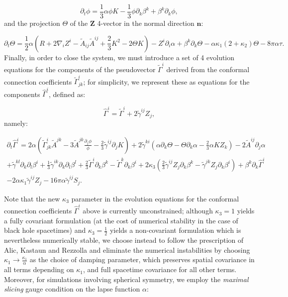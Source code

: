 \documentclass{article}
\begin{document}
\begin{equation}
\partial_t \phi = \frac{1}{3} \alpha \phi K - \frac{1}{3} \phi \partial_k \beta^k + \beta^k \partial_k \phi,
\end{equation}
and the projection ${\Theta}$ of the ${\mathbf{Z}}$ 4-vector in the normal direction ${\mathbf{n}}$:

\begin{equation}
\partial_t \Theta = \frac{1}{2} \alpha \left( R + 2 \nabla_i Z^i - \tilde{A}_{i j} \tilde{A}^{i j} + \frac{2}{3} K^2 - 2 \Theta K \right) - Z^i \partial_i \alpha + \beta^k \partial_k \Theta - \alpha \kappa_1 \left( 2 + \kappa_2 \right) \Theta - 8 \pi \alpha \tau.
\end{equation}
Finally, in order to close the system, we must introduce a set of 4 evolution equations for the components of the pseudovector ${\tilde{\Gamma}^{i}}$ derived from the conformal connection coefficients ${\tilde{\Gamma}_{j k}^{i}}$; for simplicity, we represent these as equations for the components ${\hat{\Gamma}^i}$, defined as:

\begin{equation}
\hat{\Gamma}^i = \tilde{\Gamma}^i + 2 \tilde{\gamma}^{i j} Z_j,
\end{equation}
namely:

\begin{multline}
\partial_t \hat{\Gamma}^i = 2 \alpha \left( \tilde{\Gamma}_{j k}^{i} \tilde{A}^{j k} - 3 \tilde{A}^{j k} \frac{\partial_j \phi}{\phi} - \frac{2}{3} \tilde{\gamma}^{i j} \partial_j K \right) + 2 \tilde{\gamma}^{k i} \left( \alpha \partial_k \Theta - \Theta \partial_k \alpha - \frac{2}{3} \alpha K Z_k \right) - 2 \tilde{A}^{i j} \partial_j \alpha\\
+ \tilde{\gamma}^{k l} \partial_k \partial_l \beta^i + \frac{1}{3} \tilde{\gamma}^{i k} \partial_k \partial_l \beta^l + \frac{2}{3} \tilde{\Gamma}^i \partial_k \beta^k - \tilde{\Gamma}^k \partial_k \beta^i + 2 \kappa_3 \left( \frac{2}{3} \tilde{\gamma}^{i j} Z_j \partial_k \beta^k - \tilde{\gamma}^{j k} Z_j \partial_k \beta^i \right) + \beta^k \partial_k \hat{\Gamma}^i\\
- 2 \alpha \kappa_1 \tilde{\gamma}^{i j} Z_j - 16 \pi \alpha \tilde{\gamma}^{i j} S_j.
\end{multline}

Note that the new ${\kappa_3}$ parameter in the evolution equations for the conformal connection coefficients ${\hat{\Gamma}^i}$ above is currently unconstrained; although ${\kappa_3 = 1}$ yields a fully covariant formulation (at the cost of numerical stability in the case of black hole spacetimes) and ${\kappa_3 = \frac{1}{2}}$ yields a non-covariant formulation which is nevertheless numerically stable, we choose instead to follow the prescription of Alic, Kastaun and Rezzolla\cite{alic2} and eliminate the numerical instabilities by choosing ${\kappa_1 \to \frac{\kappa_1}{\alpha}}$ as the choice of damping parameter, which preserves spatial covariance in all terms depending on ${\kappa_1}$, and full spacetime covariance for all other terms. Moreover, for simulations involving spherical symmetry, we employ the \textit{maximal slicing} gauge condition\cite{alcubierre}\cite{alcubierre2} on the lapse function ${\alpha}$:
\end{document}
